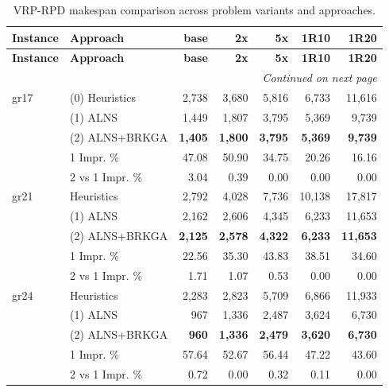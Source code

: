 \documentclass{article}
\begin{document}
\begin{longtable}{p{1.5cm}|p{3cm}|r|r|r|r|r}
\caption{VRP-RPD makespan comparison across problem variants and approaches.}
\label{tab:vrp-rpd-combined} \\
\toprule
\textbf{Instance} & \textbf{Approach} & \textbf{base} & \textbf{2x} & \textbf{5x} & \textbf{1R10} & \textbf{1R20} \\
\midrule
\endfirsthead

\toprule
\textbf{Instance} & \textbf{Approach} & \textbf{base} & \textbf{2x} & \textbf{5x} & \textbf{1R10} & \textbf{1R20} \\
\midrule
\endhead

\midrule
\multicolumn{7}{r}{\textit{Continued on next page}} \\
\endfoot

\bottomrule
\endlastfoot

gr17 & (0) Heuristics & 2,738 & 3,680 & 5,816 & 6,733 & 11,616 \\
 & (1) ALNS & 1,449 & 1,807 & 3,795 & 5,369 & 9,739 \\
 & (2) ALNS+BRKGA & \textbf{1,405} & \textbf{1,800} & \textbf{3,795} & \textbf{5,369} & \textbf{9,739} \\
 & 1 Impr. \% & 47.08 & 50.90 & 34.75 & 20.26 & 16.16 \\
 & 2 vs 1 Impr. \% & 3.04 & 0.39 & 0.00 & 0.00 & 0.00 \\
\midrule

gr21 & Heuristics & 2,792 & 4,028 & 7,736 & 10,138 & 17,817 \\
  & (1) ALNS & 2,162 & 2,606 & 4,345 & 6,233 & 11,653 \\
  & (2) ALNS+BRKGA & \textbf{2,125} & \textbf{2,578} & \textbf{4,322} & \textbf{6,233} & \textbf{11,653} \\
 & 1 Impr. \% &22.56 & 35.30 & 43.83 & 38.51 & 34.60 \\
& 2 vs 1 Impr. \% & 1.71 & 1.07 & 0.53 & 0.00 & 0.00 \\
\midrule

gr24 & Heuristics & 2,283 & 2,823 & 5,709 & 6,866 & 11,933 \\
  & (1) ALNS & 967 & 1,336 & 2,487 & 3,624 & 6,730 \\
  & (2) ALNS+BRKGA & \textbf{960} & \textbf{1,336} & \textbf{2,479} & \textbf{3,620} & \textbf{6,730} \\
 & 1 Impr. \% &57.64 & 52.67 & 56.44 & 47.22 & 43.60 \\
& 2 vs 1 Impr. \% & 0.72 & 0.00 & 0.32 & 0.11 & 0.00 \\
\midrule


\end{longtable}
\end{document}
